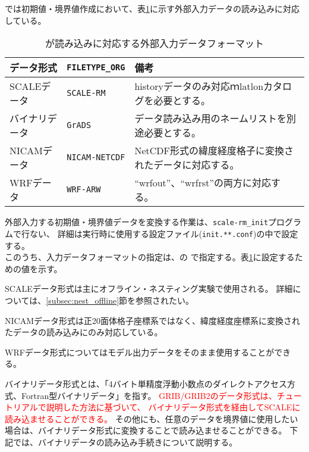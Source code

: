 \section{\SecAdvanceInputDataSetting} \label{sec:adv_datainput}

\scalerm では初期値・境界値作成において、表\ref{tab:inputdata_format}に示す外部入力データの読み込みに対応している。

\begin{table}[htb]
\begin{center}
\caption{\scalelib が読み込みに対応する外部入力データフォーマット}
\begin{tabularx}{150mm}{|l|l|X|} \hline
 \rowcolor[gray]{0.9} データ形式      & \verb|FILETYPE_ORG|  & 備考 \\ \hline
 SCALEデータ   & \verb|SCALE-RM|     & historyデータのみ対応ｍlatlonカタログを必要とする。 \\ \hline
 バイナリデータ & \verb|GrADS|        & データ読み込み用のネームリストを別途必要とする。       \\ \hline
 NICAMデータ   & \verb|NICAM-NETCDF| & NetCDF形式の緯度経度格子に変換されたデータに対応する。 \\ \hline
 WRFデータ     & \verb|WRF-ARW|      & ``wrfout''、``wrfrst''の両方に対応する。          \\ \hline
\end{tabularx}
\label{tab:inputdata_format}
\end{center}
\end{table}


外部入力する初期値・境界値データを変換する作業は、\verb|scale-rm_init|プログラムで行ない、
詳細は実行時に使用する設定ファイル(\verb|init.**.conf|)の中で設定する。\\
このうち、入力データフォーマットの指定は、の
で指定する。表\ref{tab:inputdata_format}に設定するための値を示す。

SCALEデータ形式は主にオフライン・ネスティング実験で使用される。
詳細については、\ref{subsec:nest_offline}節を参照されたい。

NICAMデータ形式は正20面体格子座標系ではなく、緯度経度座標系に変換されたデータの読み込みにのみ対応している。

WRFデータ形式についてはモデル出力データをそのまま使用することができる。

バイナリデータ形式とは、「4バイト単精度浮動小数点のダイレクトアクセス方式、Fortran型バイナリデータ」を指す。
\textcolor{red}{GRIB/GRIB2のデータ形式は、チュートリアルで説明した方法に基づいて、
バイナリデータ形式を経由してSCALEに読み込ませることができる。}
その他にも、任意のデータを境界値に使用したい場合は、バイナリデータ形式に変換することで読み込ませることができる。
下記では、バイナリデータの読み込み手続きについて説明する。

